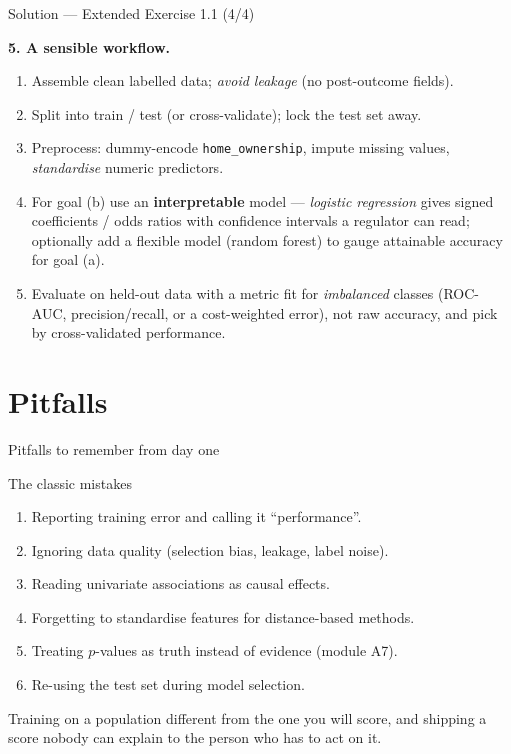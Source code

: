 \documentclass[aspectratio=169,11pt]{beamer}
\begin{document}
\begin{frame}{Solution --- Extended Exercise 1.1 (4/4)}
\begin{solutionbox}
\textbf{5. A sensible workflow.}
\begin{enumerate}\setlength\itemsep{0pt}
  \item Assemble clean labelled data; \emph{avoid leakage} (no post-outcome fields).
  \item Split into train / test (or cross-validate); lock the test set away.
  \item Preprocess: dummy-encode \texttt{home\_ownership}, impute missing values, \emph{standardise} numeric predictors.
  \item For goal (b) use an \textbf{interpretable} model --- \emph{logistic regression} gives signed coefficients / odds ratios with confidence intervals a regulator can read; optionally add a flexible model (random forest) to gauge attainable accuracy for goal (a).
  \item Evaluate on held-out data with a metric fit for \emph{imbalanced} classes (ROC-AUC, precision/recall, or a cost-weighted error), not raw accuracy, and pick by cross-validated performance.
\end{enumerate}
\end{solutionbox}
\end{frame}


\section{Pitfalls}

\begin{frame}{Pitfalls to remember from day one}
  \begin{alertblock}{The classic mistakes}
    \begin{enumerate}
      \item Reporting training error and calling it ``performance''.
      \item Ignoring data quality (selection bias, leakage, label
            noise).
      \item Reading univariate associations as causal effects.
      \item Forgetting to standardise features for distance-based
            methods.
      \item Treating $p$-values as truth instead of evidence (module A7).
      \item Re-using the test set during model selection.
    \end{enumerate}
  \end{alertblock}
  \begin{takeaway}
    Training on a population different from the one you will score, and shipping a score nobody
    can explain to the person who has to act on it.
  \end{takeaway}
\end{frame}
\end{document}
